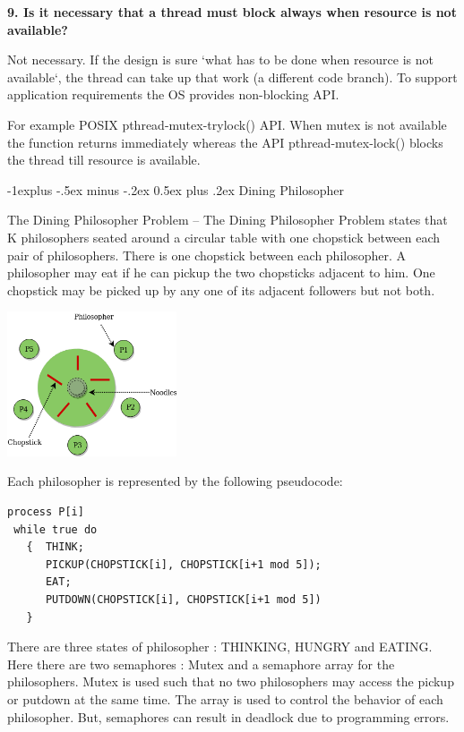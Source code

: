 \documentclass[8pt,landscape]{article}
\makeatletter
\renewcommand{\subsection}{\@startsection{subsection}{2}{0mm}%
                                {-1explus -.5ex minus -.2ex}%
                                {0.5ex plus .2ex}%
                                {\normalfont\scriptsize\bfseries}}
\makeatother
\begin{document}
\begin{multicols}{3}
\begin{tiny}
\textbf{9. Is it necessary that a thread must block always when resource is not available?}

Not necessary. If the design is sure ‘what has to be done when resource is not available‘, the thread can take up that work (a different code branch). To support application requirements the OS provides non-blocking API.

For example POSIX pthread-mutex-trylock() API. When mutex is not available the function returns immediately whereas the API pthread-mutex-lock() blocks the thread till resource is available.

\subsection{Dining Philosopher}

The Dining Philosopher Problem – The Dining Philosopher Problem states that K philosophers seated around a circular table with one chopstick between each pair of philosophers. There is one chopstick between each philosopher. A philosopher may eat if he can pickup the two chopsticks adjacent to him. One chopstick may be picked up by any one of its adjacent followers but not both.

\begingroup
	\centering
	\includegraphics[width=5cm]{philo.png}
	\label{fig:a}
\endgroup

Each philosopher is represented by the following pseudocode:

\begin{verbatim}
process P[i]
 while true do
   {  THINK;
      PICKUP(CHOPSTICK[i], CHOPSTICK[i+1 mod 5]);
      EAT;
      PUTDOWN(CHOPSTICK[i], CHOPSTICK[i+1 mod 5])
   }
\end{verbatim}

There are three states of philosopher : THINKING, HUNGRY and EATING. Here there are two semaphores : Mutex and a semaphore array for the philosophers. Mutex is used such that no two philosophers may access the pickup or putdown at the same time. The array is used to control the behavior of each philosopher. But, semaphores can result in deadlock due to programming errors.



\end{tiny}

\end{multicols}
\end{document}
